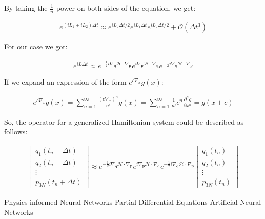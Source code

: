 \documentclass[draft]{agujournal2019}
\begin{document}
\begin{definition}
By taking the $\frac{1}{n}$ power on both sides of the equation, we get:

\begin{align*}
    e^{(iL_1 + iL_2) \Delta t} \approx e^{iL_2 \Delta t / 2} e^{iL_1 \Delta t} e^{iL_2 \Delta t / 2} + \mathcal{O}(\Delta t^3)
\end{align*}

For our case we got:

\begin{align*}
    e^{iL\Delta t} \approx e^{- \frac{1}{2} i\nabla_{\mathbf{q}} \mathcal{H} \cdot \nabla_{\mathbf{p}}}e^{i\nabla_{\mathbf{p}} \mathcal{H} \cdot \nabla_{\mathbf{q}}}e^{- \frac{1}{2} i\nabla_{\mathbf{q}} \mathcal{H} \cdot \nabla_{\mathbf{p}}}
\end{align*}

If we expand an expression of the form $e^{c\nabla_{x}} g(x)$:

\begin{align*}
    e^{c\nabla_x} g(x) = \sum_{n = 1}^\infty \frac{\left(c \nabla_x\right)^n}{n!} g(x)= \sum_{n = 1}^\infty \frac{1}{n!} c^n \frac{\partial^n g}{\partial x^n} = g(x + c)
\end{align*}

So, the operator for a generalized Hamiltonian system could be described as follows:

\begin{align*}
    \begin{bmatrix} q_1(t_n + \Delta t) \\ q_2(t_n + \Delta t) \\ \vdots \\ p_{3N}(t_n + \Delta t)\end{bmatrix} \approx e^{- \frac{1}{2}i\nabla_\mathbf{q} \mathcal{H} \cdot \nabla_\mathbf{p}} e^{i\nabla_\mathbf{p} \mathcal{H} \cdot \nabla_\mathbf{q}} e^{- \frac{1}{2}i\nabla_\mathbf{q} \mathcal{H} \cdot \nabla_\mathbf{p}}
    \begin{bmatrix} q_1(t_n) \\ q_2(t_n) \\ \vdots \\ p_{3N}(t_n) \end{bmatrix}
\end{align*}


\end{definition}

\begin{acronyms}
    Physics informed Neural Networks
    Partial Differential Equations
    Artificial Neural Networks
\end{acronyms}
\end{document}
